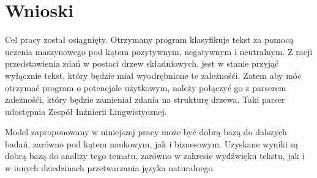 \chapter{Wnioski}
\label{cha:wnioski}

Cel pracy został osiągnięty. Otrzymany program klasyfikuje tekst za pomocą uczenia maszynowego pod kątem pozytywnym, negatywnym i neutralnym. Z racji przedstawienia zdań w postaci drzew składniowych, jest w stanie przyjąć wyłącznie tekst, który będzie miał wyodrębnione te zależnośći. Zatem aby móc otrzymać program o potencjale użytkowym, należy połączyć go z parserem zależnośći, który będzie zamieniał zdania na strukturę drzewa. Taki parser udostępnia Zespół Inżnierii Lingwistycznej\cite{treebank}.

Model zaproponowany w niniejszej pracy może być dobrą bazą do dalszych badań, zarówno pod kątem naukowym, jak i biznesowym. Uzyskane wyniki są dobrą bazą do analizy tego tematu, zarówno w zakresie wydźwięku tekstu, jak i w innych dziedzinach przetwarzania języka naturalnego.
